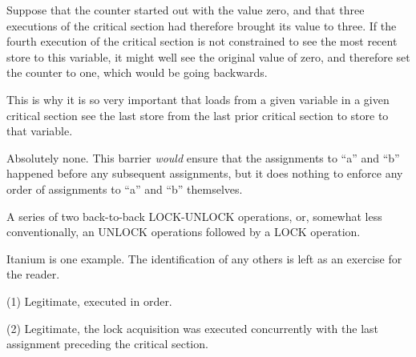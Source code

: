 
	Suppose that the counter started out with the value zero,
	and that three executions of the critical section had therefore
	brought its value to three.
	If the fourth execution of the critical section is not constrained
	to see the most recent store to this variable, it might well see
	the original value of zero, and therefore set the counter to
	one, which would be going backwards.
	
	This is why it is so very important that loads from a given variable
	in a given critical
	section see the last store from the last prior critical section to
	store to that variable.


	Absolutely none.  This barrier {\em would} ensure that the
	assignments to ``a'' and ``b'' happened before any subsequent
	assignments, but it does nothing to enforce any order of
	assignments to ``a'' and ``b'' themselves.


	A series of two back-to-back LOCK-UNLOCK operations, or, somewhat
	less conventionally, an UNLOCK operations followed by a LOCK
	operation.


	Itanium is one example.
	The identification of any others is left as an
	exercise for the reader.


	(1) Legitimate, executed in order.

	(2) Legitimate, the lock acquisition was executed concurrently
	with the last assignment preceding the critical section.

